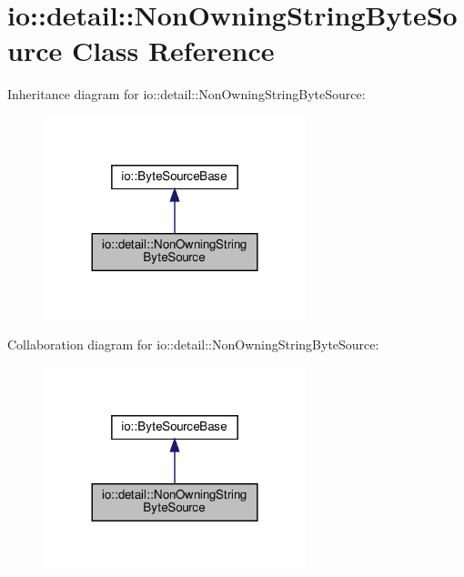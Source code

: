 \hypertarget{classio_1_1detail_1_1NonOwningStringByteSource}{}\section{io\+:\+:detail\+:\+:Non\+Owning\+String\+Byte\+Source Class Reference}
\label{classio_1_1detail_1_1NonOwningStringByteSource}


Inheritance diagram for io\+:\+:detail\+:\+:Non\+Owning\+String\+Byte\+Source\+:\nopagebreak
\begin{figure}[H]
\begin{center}
\leavevmode
\includegraphics[width=216pt]{classio_1_1detail_1_1NonOwningStringByteSource__inherit__graph}
\end{center}
\end{figure}


Collaboration diagram for io\+:\+:detail\+:\+:Non\+Owning\+String\+Byte\+Source\+:\nopagebreak
\begin{figure}[H]
\begin{center}
\leavevmode
\includegraphics[width=216pt]{classio_1_1detail_1_1NonOwningStringByteSource__coll__graph}
\end{center}
\end{figure}
